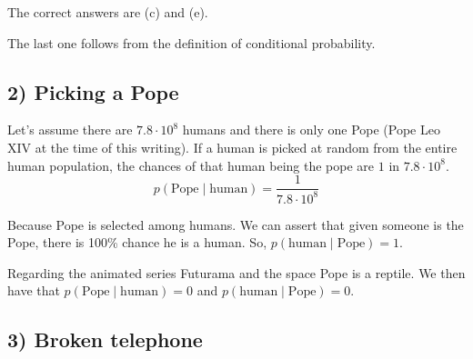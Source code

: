 \documentclass[14pt]{extarticle}
\begin{document}

The correct answers are (c) and (e).

The last one follows from the definition of conditional probability.

\subsection*{2) Picking a Pope}

Let's assume there are $7.8 \cdot 10^8$ humans and there is only one Pope (Pope Leo XIV at the time of this writing).
If a human is picked at random from the entire human population, the chances of that human being the pope are $1$ in $7.8 \cdot 10^8$.
\[
p(\text{Pope} \mid \text{human}) = \frac{1}{7.8 \cdot 10^8}
\]

Because Pope is selected among humans.
We can assert that given someone is the Pope, there is 100\% chance he is a human.
So, $p(\text{human} \mid \text{Pope}) = 1$.

Regarding the animated series Futurama and the space Pope is a reptile.
We then have that $p(\text{Pope} \mid \text{human}) = 0$ and $p(\text{human} \mid \text{Pope}) = 0$.

\subsection*{3) Broken telephone}
\end{document}
